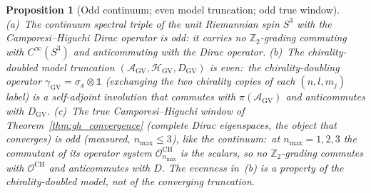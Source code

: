 \documentclass[11pt]{article}
\newtheorem{proposition}{Proposition}
\begin{document}
\begin{proposition}[Odd continuum; even model truncation; odd true window]
\label{prop:odd}
(a)~The continuum spectral triple of the unit Riemannian spin $S^3$
with the Camporesi--Higuchi Dirac operator is \emph{odd}: it carries no
$\mathbb{Z}_2$-grading commuting with $C^\infty(S^3)$ and
anticommuting with the Dirac operator.
(b)~The \emph{chirality-doubled model} truncation
$(\mathcal{A}_{\mathrm{GV}}, \mathcal{H}_{\mathrm{GV}},
D_{\mathrm{GV}})$ is \emph{even}:\ the chirality-doubling operator
$\gamma_{\mathrm{GV}} = \sigma_x \otimes \mathbb{1}$ (exchanging the
two chirality copies of each $(n, l, m_j)$ label) is a self-adjoint
involution that commutes with $\pi(\mathcal{A}_{\mathrm{GV}})$ and
anticommutes with $D_{\mathrm{GV}}$.
(c)~The \emph{true} Camporesi--Higuchi window of
Theorem~\ref{thm:gh_convergence} (complete Dirac eigenspaces, the object
that converges) is \emph{odd} (measured, $n_{\max} \le 3$), like the continuum:\ at
$n_{\max} = 1, 2, 3$ the commutant of its operator system
$\mathcal{O}^{\mathrm{CH}}_{n_{\max}}$ is the scalars, so no
$\mathbb{Z}_2$-grading commutes with $\mathcal{O}^{\mathrm{CH}}$ and
anticommutes with $D$.  The evenness in~(b) is a property of the
chirality-doubled model, not of the converging truncation.
\end{proposition}
\end{document}
